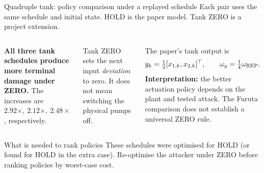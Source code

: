 \documentclass[8pt,aspectratio=169]{beamer}
\gdef\CPSOrigin{PAPER}%
\gdef\CPSSourceContext{}%
\begin{document}
\begin{frame}[t]{Quadruple tank: policy comparison under a replayed schedule}
\gdef\CPSSourceContext{}
\gdef\CPSOrigin{OURS}
\small
Each pair uses the same schedule and initial state.
HOLD is the paper model. Tank ZERO is a project extension.
\vspace{1mm}
\begin{columns}[T,onlytextwidth]
\footnotesize
\textbf{All three tank schedules produce more terminal damage under ZERO.}
The increases are \(2.92\times,\ 2.12\times,\ 2.48\times\), respectively.
\par\vspace{3mm}
Tank ZERO sets the next input \emph{deviation} to zero. It does not mean
switching the physical pumps off.
\par\vspace{2mm}
The paper's tank output is
\[
 y_k=\tfrac12[x_{1,k},x_{2,k}]^\top,
 \qquad \omega_y=\tfrac14\omega_{\rm REP}.
\]
\textbf{Interpretation:} the better actuation policy depends on the plant
and tested attack. The Furuta comparison does not establish a universal ZERO rule.
\end{columns}
\begin{block}{What is needed to rank policies}
\footnotesize These schedules were optimised for HOLD (or found for HOLD in the extra case). Re-optimise the attacker under ZERO before ranking policies by worst-case cost.
\end{block}

\end{frame}
\end{document}
